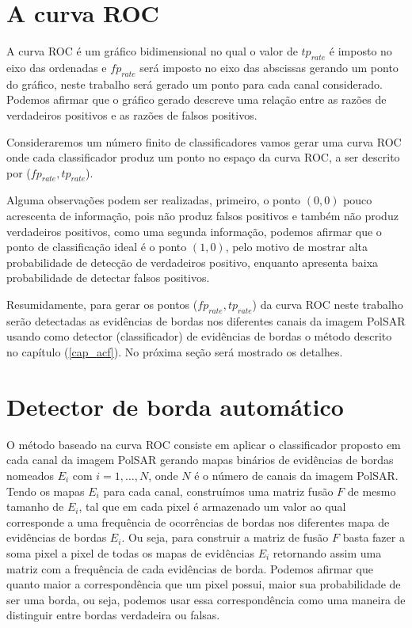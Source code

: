 \section{A curva ROC}
A curva ROC é um gráfico bidimensional no qual o valor de $tp_{rate}$ é imposto no eixo das ordenadas e $fp_{rate}$ será imposto no eixo das abscissas gerando um ponto do gráfico, neste trabalho será gerado um ponto para cada canal considerado. Podemos afirmar que o gráfico gerado descreve uma relação entre as razões de verdadeiros positivos e as razões de falsos positivos. 

Consideraremos um número finito de classificadores vamos gerar uma curva ROC onde cada classificador produz um ponto no espaço da curva ROC, a ser descrito por ($fp_{rate}, tp_{rate}$).

Alguma observações podem ser realizadas, primeiro, o ponto $(0,0)$ pouco acrescenta de informação, pois não produz falsos positivos e também não produz verdadeiros positivos, como uma segunda informação, podemos afirmar que o ponto de classificação ideal é o ponto $(1,0)$, pelo motivo de mostrar alta probabilidade de detecção de verdadeiros positivo, enquanto apresenta baixa probabilidade de detectar falsos positivos. 

 Resumidamente, para gerar os pontos ($fp_{rate}, tp_{rate}$) da curva ROC neste trabalho serão detectadas as evidências de bordas nos diferentes canais da imagem PolSAR usando como detector (classificador) de evidências de bordas o método descrito no capítulo (\ref{cap_acf}). No próxima seção será mostrado os detalhes.
 
\section{Detector de borda automático}

O método baseado na curva ROC consiste em aplicar o classificador proposto em cada canal da imagem PolSAR gerando mapas binários de evidências de bordas nomeados $E_i$ com $i=1,\dots,N$, onde $N$ é o número de canais da imagem PolSAR. Tendo os mapas $E_i$  para cada canal, construímos uma matriz fusão $F$ de mesmo tamanho de $E_i$, tal que em cada pixel é armazenado um valor ao qual corresponde a uma frequência de ocorrências de bordas nos diferentes mapa de evidências de bordas $E_i$. Ou seja, para construir a matriz de fusão $F$ basta fazer a soma pixel a pixel de todas os mapas de evidências $E_i$ retornando assim uma matriz com a frequência de cada evidências de borda. Podemos afirmar que quanto maior a correspondência que um pixel possui, maior sua probabilidade de ser uma borda, ou seja, podemos usar essa correspondência como uma maneira de distinguir entre bordas verdadeira ou falsas.

